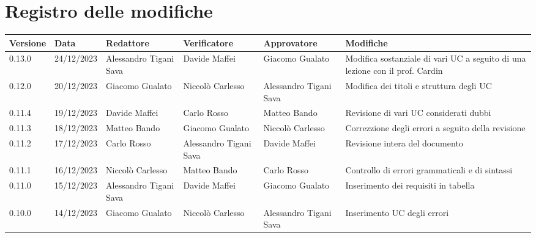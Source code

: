 \section*{Registro delle modifiche}


\begin{table}[H]
	\centering
	\fontsize{10}{12}\selectfont
	\begin{tabularx}{\textwidth}{X|X|X|X|X|X}
		\textbf{Versione}     & \textbf{Data}        & \textbf{Redattore}     &
		\textbf{Verificatore} & \textbf{Approvatore} & \textbf{Modifiche}                                                                                                                    \\
		\toprule
		0.13.0	              & 24/12/2023           & Alessandro Tigani Sava & Davide Maffei          & Giacomo Gualato        & Modifica sostanziale di vari UC a seguito di una lezione con il prof. Cardin                                     \\
		\hline
		0.12.0	              & 20/12/2023           & Giacomo Gualato        & Niccolò Carlesso       & Alessandro Tigani Sava & Modifica dei titoli e struttura degli UC                                     \\
		\hline
		0.11.4	              & 19/12/2023           & Davide Maffei          & Carlo Rosso            & Matteo Bando           & Revisione di vari UC considerati dubbi                                     \\
		\hline
		0.11.3                & 18/12/2023           & Matteo Bando           & Giacomo Gualato        & Niccolò Carlesso       & Correzzione degli errori a seguito della revisione                                     \\
		\hline
		0.11.2                & 17/12/2023           & Carlo Rosso            & Alessandro Tigani Sava & Davide Maffei          & Revisione intera del documento                                     \\
		\hline
		0.11.1                & 16/12/2023           & Niccolò Carlesso       & Matteo Bando           & Carlo Rosso            & Controllo di errori grammaticali e di sintassi                                     \\
		\hline
		0.11.0                & 15/12/2023           & Alessandro Tigani Sava & Davide Maffei          & Giacomo Gualato        & Inserimento dei requisiti in tabella                                     \\
		\hline
		0.10.0                & 14/12/2023           & Giacomo Gualato        & Niccolò Carlesso       & Alessandro Tigani Sava & Inserimento UC degli errori                                     \\
		\bottomrule
	\end{tabularx}
\end{table}


